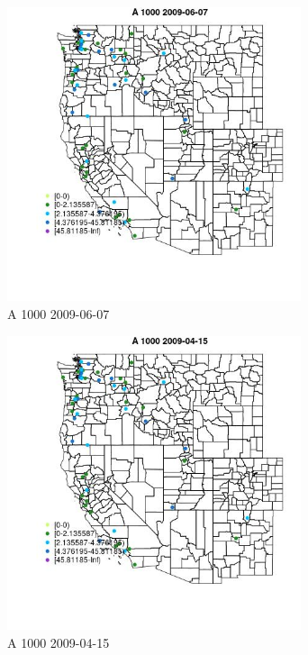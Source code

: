 \begin{figure} 
\centering  
\includegraphics[width=0.77\textwidth]{Code_Outputs/Report_ML_input_PM25_Step4_part_e_de_duplicated_aves_MapObsA_10002009-06-07.jpg} 
\caption{\label{fig:Report_ML_input_PM25_Step4_part_e_de_duplicated_avesMapObsA_10002009-06-07}A 1000 2009-06-07} 
\end{figure} 
 

\begin{figure} 
\centering  
\includegraphics[width=0.77\textwidth]{Code_Outputs/Report_ML_input_PM25_Step4_part_e_de_duplicated_aves_MapObsA_10002009-04-15.jpg} 
\caption{\label{fig:Report_ML_input_PM25_Step4_part_e_de_duplicated_avesMapObsA_10002009-04-15}A 1000 2009-04-15} 
\end{figure} 
 

